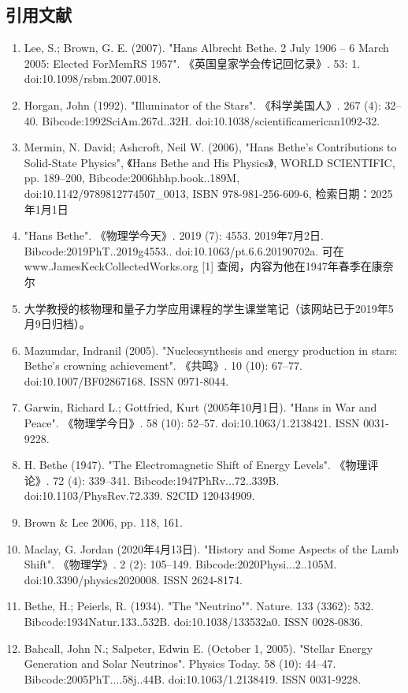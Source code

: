 \subsection{引用文献}  
\begin{enumerate}
\item Lee, S.; Brown, G. E. (2007). "Hans Albrecht Bethe. 2 July 1906 -- 6 March 2005: Elected ForMemRS 1957". 《英国皇家学会传记回忆录》. 53: 1. doi:10.1098/rsbm.2007.0018.  
\item Horgan, John (1992). "Illuminator of the Stars". 《科学美国人》. 267 (4): 32–40. Bibcode:1992SciAm.267d..32H. doi:10.1038/scientificamerican1092-32.  
\item Mermin, N. David; Ashcroft, Neil W. (2006), "Hans Bethe's Contributions to Solid-State Physics", 《Hans Bethe and His Physics》, WORLD SCIENTIFIC, pp. 189–200, Bibcode:2006hbhp.book..189M, doi:10.1142/9789812774507_0013, ISBN 978-981-256-609-6, 检索日期：2025年1月1日  
\item "Hans Bethe". 《物理学今天》. 2019 (7): 4553. 2019年7月2日. Bibcode:2019PhT..2019g4553.. doi:10.1063/pt.6.6.20190702a.  
可在 www.JamesKeckCollectedWorks.org [1] 查阅，内容为他在1947年春季在康奈尔\item 大学教授的核物理和量子力学应用课程的学生课堂笔记（该网站已于2019年5月9日归档）。  
\item Mazumdar, Indranil (2005). "Nucleosynthesis and energy production in stars: Bethe's crowning achievement". 《共鸣》. 10 (10): 67–77. doi:10.1007/BF02867168. ISSN 0971-8044.
\item Garwin, Richard L.; Gottfried, Kurt (2005年10月1日). "Hans in War and Peace". 《物理学今日》. 58 (10): 52–57. doi:10.1063/1.2138421. ISSN 0031-9228.  
\item H. Bethe (1947). "The Electromagnetic Shift of Energy Levels". 《物理评论》. 72 (4): 339–341. Bibcode:1947PhRv...72..339B. doi:10.1103/PhysRev.72.339. S2CID 120434909.  
\item Brown & Lee 2006, pp. 118, 161.  
\item Maclay, G. Jordan (2020年4月13日). "History and Some Aspects of the Lamb Shift". 《物理学》. 2 (2): 105–149. Bibcode:2020Physi...2..105M. doi:10.3390/physics2020008. ISSN 2624-8174.
\item Bethe, H.; Peierls, R. (1934). "The "Neutrino"". Nature. 133 (3362): 532. Bibcode:1934Natur.133..532B. doi:10.1038/133532a0. ISSN 0028-0836.
\item Bahcall, John N.; Salpeter, Edwin E. (October 1, 2005). "Stellar Energy Generation and Solar Neutrinos". Physics Today. 58 (10): 44–47. Bibcode:2005PhT....58j..44B. doi:10.1063/1.2138419. ISSN 0031-9228.

\end{enumerate}
